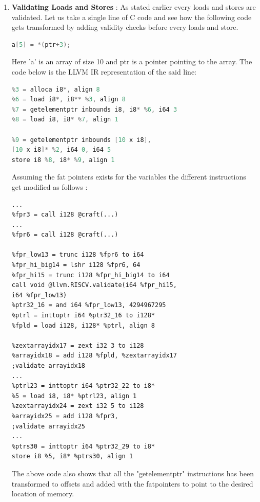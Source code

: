 \begin{enumerate}
    \item \textbf{Validating Loads and Stores} : As stated earlier every loads and stores are validated. Let us take a single line of C code and see how the following code gets transformed by adding validity checks before every loads and store.
    \begin{lstlisting}[language=C]
a[5] = *(ptr+3);
    \end{lstlisting}
    Here 'a' is an array of size 10 and ptr is a pointer pointing to the array. The code below is the LLVM IR representation of the said line:
    \begin{lstlisting}[language=C]
%2 = alloca [10 x i8], align 1
%3 = alloca i8*, align 8
%6 = load i8*, i8** %3, align 8
%7 = getelementptr inbounds i8, i8* %6, i64 3
%8 = load i8, i8* %7, align 1

%9 = getelementptr inbounds [10 x i8], 
[10 x i8]* %2, i64 0, i64 5
store i8 %8, i8* %9, align 1
    \end{lstlisting}
    Assuming the fat pointers exists for the variables the different instructions get modified as follows : 
    \begin{lstlisting}
...
%fpr3 = call i128 @craft(...)
...
%fpr6 = call i128 @craft(...)

%fpr_low13 = trunc i128 %fpr6 to i64
%fpr_hi_big14 = lshr i128 %fpr6, 64
%fpr_hi15 = trunc i128 %fpr_hi_big14 to i64
call void @llvm.RISCV.validate(i64 %fpr_hi15,
i64 %fpr_low13)
%ptr32_16 = and i64 %fpr_low13, 4294967295
%ptrl = inttoptr i64 %ptr32_16 to i128*
%fpld = load i128, i128* %ptrl, align 8

%zextarrayidx17 = zext i32 3 to i128
%arrayidx18 = add i128 %fpld, %zextarrayidx17
;validate arrayidx18
...
%ptrl23 = inttoptr i64 %ptr32_22 to i8*
%5 = load i8, i8* %ptrl23, align 1
%zextarrayidx24 = zext i32 5 to i128
%arrayidx25 = add i128 %fpr3, 
;validate arrayidx25
...
%ptrs30 = inttoptr i64 %ptr32_29 to i8*
store i8 %5, i8* %ptrs30, align 1

    \end{lstlisting}
    The above code also shows that all the "getelementptr" instructions has been transformed to offsets and added with the fatpointers to point to the desired location of memory.\\
    

\end{enumerate}
